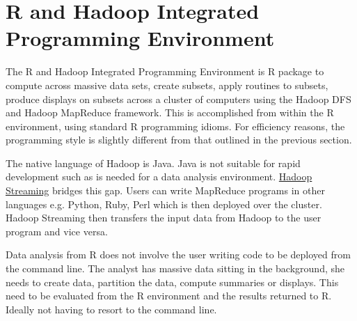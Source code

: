 \documentclass[letterpaper,10pt,english]{sphinxmanual}
\begin{document}
\section{R and Hadoop Integrated Programming Environment}
\label{introduction:r-and-hadoop-integrated-programming-environment}
The R and Hadoop Integrated Programming Environment is R package to compute
across massive data sets, create subsets, apply routines to subsets, produce
displays on subsets across a cluster of computers using the Hadoop DFS and
Hadoop MapReduce framework. This is accomplished from within the R environment,
using standard R programming idioms. For efficiency reasons, the programming
style is slightly different from that outlined in the previous section.

The native language of Hadoop is Java. Java is not suitable for rapid
development such as is needed for a data analysis environment. \href{http://hadoop.apache.org/common/docs/current/streaming.html}{Hadoop Streaming}
bridges this gap. Users can write MapReduce programs in other languages
e.g. Python, Ruby, Perl which is then deployed over the cluster. Hadoop
Streaming then transfers the input data from Hadoop to the user program and vice
versa.

Data analysis from R does not involve the user writing code to be deployed from
the command line. The analyst has massive data sitting in the background, she
needs to create data, partition the data, compute summaries or displays. This
need to be evaluated from the R environment and the results returned to
R. Ideally not having to resort to the command line.
\end{document}
